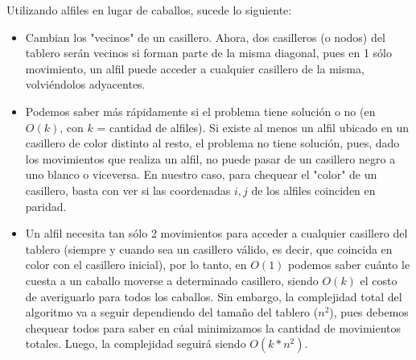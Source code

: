 Utilizando alfiles en lugar de caballos, sucede lo siguiente: 

\begin{itemize}
        \item Cambian los "vecinos" de un casillero. Ahora, dos casilleros (o nodos) del tablero
        serán vecinos si forman parte de la misma diagonal, pues en 1 sólo movimiento, un alfil
        puede acceder a cualquier casillero de la misma, volviéndolos adyacentes.

        \item Podemos saber más rápidamente si el problema tiene solución o no (en $O(k)$, 
        con $k$ = cantidad de alfiles). Si existe al menos un alfil ubicado en un casillero de color   
        distinto al resto, el problema no tiene solución, pues, dado los movimientos que realiza un 
        alfil, no puede pasar de un casillero negro a uno blanco o viceversa. En nuestro caso, para 
        chequear el "color" de un casillero, basta con ver si las coordenadas $i, j$ de los alfiles 
        coinciden en paridad.

        \item Un alfil necesita tan sólo 2 movimientos para acceder a cualquier casillero del 
        tablero (siempre y cuando sea un casillero válido, es decir, que coincida en color con 
        el casillero inicial), por lo tanto, en $O(1)$ podemos saber cuánto le cuesta a un
        caballo moverse a determinado casillero, siendo $O(k)$ el costo de averiguarlo para todos los    
        caballos. Sin embargo, la complejidad total del algoritmo va a seguir dependiendo del tamaño del 
        tablero ($n^2$), pues debemos chequear todos para saber en cúal minimizamos la cantidad de       
        movimientos totales. Luego, la complejidad seguirá siendo $O(k*n^2)$.
\end{itemize}
